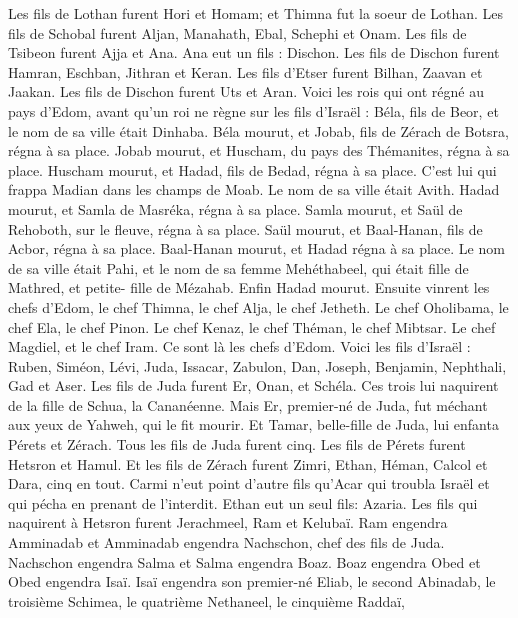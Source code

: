 \begin{multicols}{2}
Les fils de Lothan furent  Hori et Homam; et Thimna fut la soeur de Lothan.
Les fils de Schobal furent Aljan, Manahath, Ebal, Schephi et Onam. Les fils de Tsibeon furent Ajja et Ana.
Ana eut un fils : Dischon.  Les fils de Dischon furent Hamran, Eschban, Jithran et Keran.
Les fils d’Etser furent Bilhan, Zaavan et Jaakan. Les fils de Dischon furent Uts et Aran.
Voici les rois qui ont régné au pays d'Edom, avant qu’un roi ne règne sur les fils d’Israël : Béla, fils de Beor, et le nom de sa ville était Dinhaba.
Béla mourut, et Jobab, fils de Zérach de Botsra, régna à sa place.
Jobab mourut, et Huscham, du pays des Thémanites, régna à sa place.
Huscham mourut, et Hadad, fils de Bedad, régna à sa place. C’est lui qui frappa Madian dans les champs de Moab. Le nom de sa ville était Avith.
Hadad mourut, et Samla de Masréka, régna à sa place.
Samla mourut, et Saül de Rehoboth, sur le fleuve, régna à sa place.
Saül mourut, et Baal-Hanan, fils de Acbor, régna à sa place.
Baal-Hanan mourut, et Hadad régna à sa place. Le nom de sa ville était Pahi, et le nom de sa femme Mehéthabeel, qui était fille de Mathred, et petite- fille de Mézahab.
Enfin Hadad mourut. Ensuite vinrent les chefs d'Edom, le chef Thimna, le chef Alja, le chef Jetheth.
Le chef Oholibama, le chef Ela, le chef Pinon.
Le chef Kenaz, le chef Théman, le chef Mibtsar.
Le chef Magdiel, et le chef Iram. Ce sont là les chefs d'Edom.
\VerseOne{}Voici les fils d'Israël : Ruben, Siméon, Lévi, Juda, Issacar, Zabulon,
Dan, Joseph, Benjamin, Nephthali, Gad et Aser.
Les fils de Juda furent  Er, Onan, et Schéla. Ces trois lui naquirent de la fille de Schua, la Cananéenne. Mais Er, premier-né de Juda, fut méchant aux yeux de Yahweh, qui le fit mourir.
Et Tamar, belle-fille de Juda, lui enfanta Pérets et Zérach. Tous les fils de Juda furent cinq.
Les fils de Pérets furent Hetsron et Hamul.
Et les fils de Zérach furent Zimri, Ethan, Héman, Calcol et Dara, cinq en tout.
Carmi n'eut point d’autre fils qu'Acar qui troubla Israël et qui pécha en prenant de l'interdit.
Ethan eut un seul fils: Azaria.
Les fils qui naquirent à Hetsron furent Jerachmeel, Ram et Kelubaï.
Ram engendra Amminadab et Amminadab engendra Nachschon, chef des fils de Juda.
Nachschon engendra Salma et Salma engendra Boaz.
Boaz engendra Obed et Obed engendra Isaï.
Isaï engendra son premier-né Eliab, le second Abinadab, le troisième Schimea,
le quatrième Nethaneel, le cinquième Raddaï,

\end{multicols}
